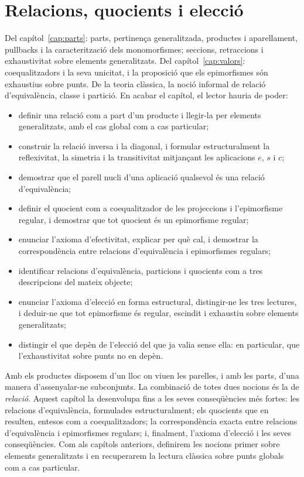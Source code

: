 \chapter{Relacions, quocients i elecció}\label{cap:relacions}

\begin{objectius}
 Del capítol~\ref{cap:parts}: parts, pertinença generalitzada, productes i aparellament, pullbacks i la caracterització dels monomorfismes; seccions, retraccions i exhaustivitat sobre elements generalitzats. Del capítol~\ref{cap:valors}: coequalitzadors i la seva unicitat, i la proposició que els epimorfismes són exhaustius sobre punts. De la teoria clàssica, la noció informal de relació d'equivalència, classe i partició.
 En acabar el capítol, el lector hauria de poder:
\begin{itemize}
  \item definir una relació com a part d'un producte i llegir-la per elements generalitzats, amb el cas global com a cas particular;
  \item construir la relació inversa i la diagonal, i formular estructuralment la reflexivitat, la simetria i la transitivitat mitjançant les aplicacions \(e\), \(s\) i \(c\);
  \item demostrar que el parell nucli d'una aplicació qualsevol és una relació d'equivalència;
  \item definir el quocient com a coequalitzador de les projeccions i l'epimorfisme regular, i demostrar que tot quocient és un epimorfisme regular;
  \item enunciar l'axioma d'efectivitat, explicar per què cal, i demostrar la correspondència entre relacions d'equivalència i epimorfismes regulars;
  \item identificar relacions d'equivalència, particions i quocients com a tres descripcions del mateix objecte;
  \item enunciar l'axioma d'elecció en forma estructural, distingir-ne les tres lectures, i deduir-ne que tot epimorfisme és regular, escindit i exhaustiu sobre elements generalitzats;
  \item distingir el que depèn de l'elecció del que ja valia sense ella: en particular, que l'exhaustivitat sobre punts no en depèn.
\end{itemize}
\end{objectius}

Amb els productes disposem d'un lloc on viuen les parelles, i amb les parts, d'una manera d'assenyalar-ne subconjunts. La combinació de totes dues nocions és la de \emph{relació}. Aquest capítol la desenvolupa fins a les seves conseqüències més fortes: les relacions d'equivalència, formulades estructuralment; els quocients que en resulten, entesos com a coequalitzadors; la correspondència exacta entre relacions d'equivalència i epimorfismes regulars; i, finalment, l'axioma d'elecció i les seves conseqüències. Com als capítols anteriors, definirem les nocions primer sobre elements generalitzats i en recuperarem la lectura clàssica sobre punts globals com a cas particular.

